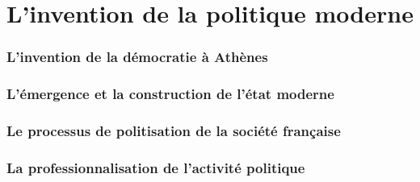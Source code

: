 	
\part{L'invention de la politique moderne}

	\section{L'invention de la démocratie à Athènes}
	
	\section{L'émergence et la construction de l'état moderne}
	
	\section{Le processus de politisation de la société française}
	
	\section{La professionnalisation de l'activité politique}
	



